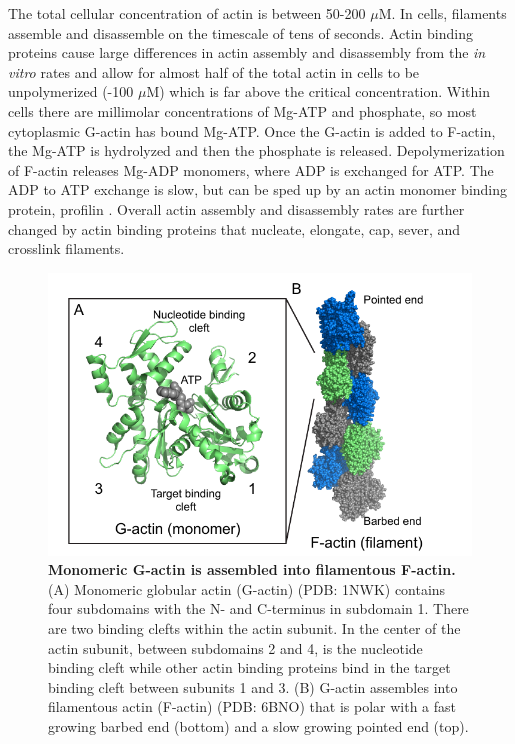 The total cellular concentration of actin is between 50-200 $\mu$M. In cells, filaments assemble and disassemble on the timescale of tens of seconds. Actin binding proteins cause large differences in actin assembly and disassembly from the \textit{in vitro} rates and allow for almost half of the total actin in cells to be unpolymerized (-100 $\mu$M) which is far above the critical concentration. Within cells there are millimolar concentrations of Mg-ATP and phosphate, so most cytoplasmic G-actin has bound Mg-ATP. Once the G-actin is added to F-actin, the Mg-ATP is hydrolyzed and then the phosphate is released. Depolymerization of F-actin releases Mg-ADP monomers, where ADP is exchanged for ATP. The ADP to ATP exchange is slow, but can be sped up by an actin monomer binding protein, profilin \citep{pollard_actin_2016}. Overall actin assembly and disassembly rates are further changed by actin binding proteins that nucleate, elongate, cap, sever, and crosslink filaments. 

\begin{figure}
\centering
\includegraphics[width=17cm]{img/ch01/actin_thesis.pdf}
\caption[Monomeric G-actin is assembled into filamentous F-actin.]{\textbf{Monomeric G-actin is assembled into filamentous F-actin.} (A) Monomeric globular actin (G-actin) (PDB: 1NWK) contains four subdomains with the N- and C-terminus in subdomain 1. There are two binding clefts within the actin subunit. In the center of the actin subunit, between subdomains 2 and 4, is the nucleotide binding cleft while other actin binding proteins bind in the target binding cleft between subunits 1 and 3. (B) G-actin assembles into filamentous actin (F-actin) (PDB: 6BNO) that is polar with a fast growing barbed end (bottom) and a slow growing pointed end (top).}
\label{fig:actin-structure}
\end{figure}

